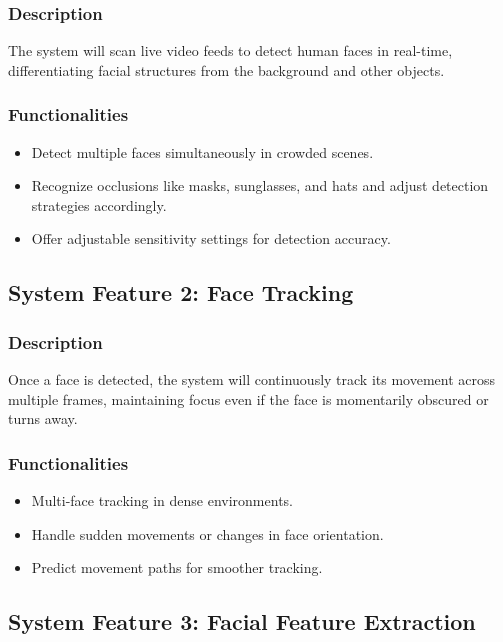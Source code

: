         \subsubsection{Description}
            The system will scan live video feeds to detect human faces in real-time, differentiating facial structures from the background and other objects.
        \subsubsection{Functionalities}
            \begin{itemize}
                \item Detect multiple faces simultaneously in crowded scenes.
                \item Recognize occlusions like masks, sunglasses, and hats and adjust detection strategies accordingly.
                \item Offer adjustable sensitivity settings for detection accuracy.                
            \end{itemize}
    
    \subsection{System Feature 2: Face Tracking}   
        \subsubsection{Description}
            Once a face is detected, the system will continuously track its movement across multiple frames, maintaining focus even if the face is momentarily obscured or turns away.
        \subsubsection{Functionalities}
            \begin{itemize}
                \item Multi-face tracking in dense environments.
                \item Handle sudden movements or changes in face orientation.
                \item Predict movement paths for smoother tracking.
                               
            \end{itemize}

    
        \subsection{System Feature 3: Facial Feature Extraction}   
